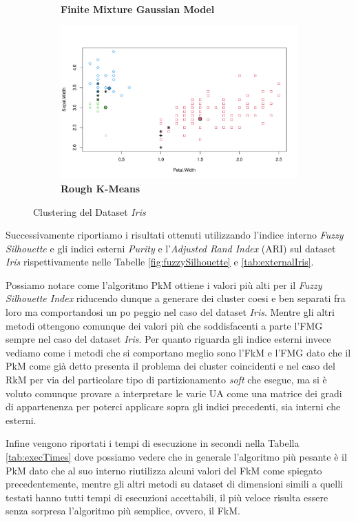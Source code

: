 \documentclass[12pt]{article}
\begin{document}
\begin{figure}[h]
\begin{subfigure}[h]{0.49\textwidth}
		\caption{\textbf{Finite Mixture Gaussian Model}}
		\label{fig:iris_mclust}
	\end{subfigure}
	\begin{subfigure}[h]{0.49\textwidth}
		\centering
		\includegraphics[width=\textwidth]{iris_rkm}
		\caption{\textbf{Rough K-Means}}
		\label{fig:iris_rkm}
	\end{subfigure}
	\caption{Clustering del Dataset \textit{Iris}}
	\label{fig:iris}
\end{figure}

Successivamente riportiamo i risultati ottenuti utilizzando l'indice interno \textit{Fuzzy Silhouette} e gli indici esterni \textit{Purity} e l'\textit{Adjusted Rand Index} (ARI) sul dataset \textit{Iris} rispettivamente nelle Tabelle \ref{fig:fuzzySilhouette} e \ref{tab:externalIris}.

Possiamo notare come l'algoritmo PkM ottiene i valori più alti per il \textit{Fuzzy Silhouette Index} riducendo dunque a generare dei cluster coesi e ben separati fra loro ma comportandosi un po peggio nel caso del dataset \textit{Iris}. Mentre gli altri metodi ottengono comunque dei valori più che soddisfacenti a parte l'FMG sempre nel caso del dataset \textit{Iris}. Per quanto riguarda gli indice esterni invece vediamo come i metodi che si comportano meglio sono l'FkM e l'FMG dato che il PkM come già detto presenta il problema dei cluster coincidenti e nel caso del RkM per via del particolare tipo di partizionamento \textit{soft} che esegue, ma si è voluto comunque provare a interpretare le varie UA come una matrice dei gradi di appartenenza per poterci applicare sopra gli indici precedenti, sia interni che esterni.

Infine vengono riportati i tempi di esecuzione in secondi nella Tabella \ref{tab:execTimes} dove possiamo vedere che in generale l'algoritmo più pesante è il PkM dato che al suo interno riutilizza alcuni valori del FkM come spiegato precedentemente, mentre gli altri metodi su dataset di dimensioni simili a quelli testati hanno tutti tempi di esecuzioni accettabili, il più veloce risulta essere senza sorpresa l'algoritmo più semplice, ovvero, il FkM.
\end{document}
